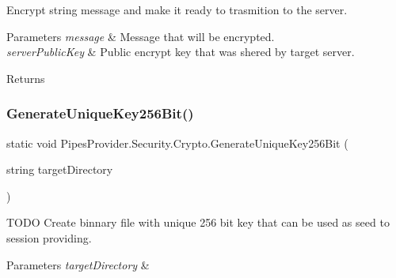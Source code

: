 Encrypt string message and make it ready to trasmition to the server. 


\begin{DoxyParams}{Parameters}
{\em message} & Message that will be encrypted.\\
\hline
{\em server\+Public\+Key} & Public encrypt key that was shered by target server.\\
\hline
\end{DoxyParams}
\begin{DoxyReturn}{Returns}

\end{DoxyReturn}
\mbox{\label{class_pipes_provider_1_1_security_1_1_crypto_a58ed72a691ed535fb8490374a393c0f1}} 
\subsubsection{\texorpdfstring{Generate\+Unique\+Key256\+Bit()}{GenerateUniqueKey256Bit()}}
{\footnotesize\ttfamily static void Pipes\+Provider.\+Security.\+Crypto.\+Generate\+Unique\+Key256\+Bit (\begin{DoxyParamCaption}\item[{string}]{target\+Directory }\end{DoxyParamCaption})\hspace{0.3cm}{\ttfamily [static]}}



T\+O\+DO Create binnary file with unique 256 bit key that can be used as seed to session providing. 


\begin{DoxyParams}{Parameters}
{\em target\+Directory} & \\
\hline
\end{DoxyParams}
\mbox{\label{class_pipes_provider_1_1_security_1_1_crypto_aeaf01f17d57b624fd4809ceb2836ebe0}} 
